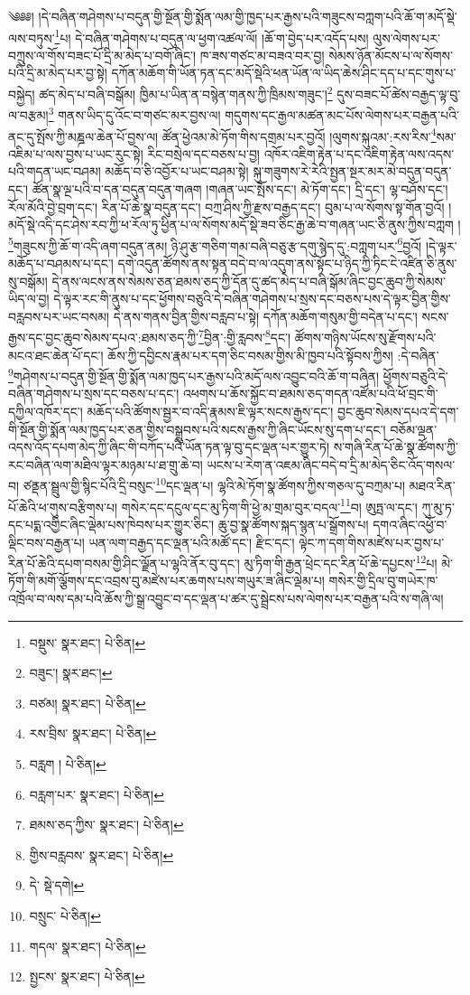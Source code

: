 \setcounter{footnote}{0} 
༄༅༅། །དེ་བཞིན་གཤེགས་པ་བདུན་གྱི་སྔོན་གྱི་སྨོན་ལམ་གྱི་ཁྱད་པར་རྒྱས་པའི་གཟུངས་བཀླག་པའི་ཆོ་ག་མདོ་སྡེ་ལས་བཏུས་\footnote{བསྡུས་  སྣར་ཐང་།  པེ་ཅིན། }པ། དེ་བཞིན་གཤེགས་པ་བདུན་ལ་ཕྱག་འཚལ་ལོ། །ཆོ་ག་བྱེད་པར་འདོད་པས། ལུས་ལེགས་པར་བཀྲུས་ལ་གོས་བཟང་པོ་དྲི་མ་མེད་པ་བགོ་ཞིང་། ཁ་ཟས་གཙང་མ་བཟའ་བར་བྱ། སེམས་ཉོན་མོངས་པ་ལ་སོགས་པའི་དྲི་མ་མེད་པར་བྱ་སྟེ། དཀོན་མཆོག་གི་ཡོན་ཏན་དང་མདོ་སྡེའི་ཕན་ཡོན་ལ་ཡིད་ཆེས་ཤིང་དད་པ་དང་གུས་པ་བསྐྱེད། ཚད་མེད་པ་བཞི་བསྒོམ། ཁྱིམ་པ་ཡིན་ན་བསྙེན་གནས་ཀྱི་ཁྲིམས་གཟུང་།\footnote{བཟུང་།  སྣར་ཐང་། } དུས་བཟང་པོ་ཚེས་བརྒྱད་ལྟ་བུ་ལ་བརྩམ།\footnote{བཙམ།  སྣར་ཐང་།  པེ་ཅིན། } གནས་ཡིད་དུ་འོང་བ་གཙང་མར་བྱས་ལ། གདུགས་དང་རྒྱལ་མཚན་མང་པོས་ལེགས་པར་བརྒྱན་པའི་ནང་དུ་སྤོས་ཀྱི་མཎྜལ་ཆེན་པོ་བྱས་ལ། ཚོན་ཕྱེའམ་མེ་ཏོག་གིས་དགྲམ་པར་བྱའོ། །ལུགས་སྐུའམ་:རས་རིས་\footnote{རས་བྲིས་  སྣར་ཐང་།  པེ་ཅིན། }སམ་འཇིམ་པ་ལས་བྱས་པ་ཡང་རུང་སྟེ། རིང་བསྲེལ་དང་བཅས་པ་བྱ། འཁོར་འཇིག་རྟེན་པ་དང་འཇིག་རྟེན་ལས་འདས་པའི་གདན་ཡང་བཤམ། མཆོད་བ་ཅི་འབྱོར་པ་ཡང་བཤམ་སྟེ། སྐུ་གཟུགས་རེ་རེའི་སྤྱན་སྔར་མར་མེ་བདུན་བདུན་དང་། ཚོན་སྣ་ལྔ་པའི་བ་དན་བདུན་བདུན་གཞག །གཞན་ཡང་སྤོས་དང་། མེ་ཏོག་དང་། དྲི་དང་། ལྷ་བཤོས་དང་། རོལ་མོའི་བྱེ་བྲག་དང་། རིན་པོ་ཆེ་སྣ་བདུན་དང་། བཀྲ་ཤིས་ཀྱི་རྫས་བརྒྱད་དང་། བུམ་པ་ལ་སོགས་སྟ་གོན་བྱའོ། །མདོ་སྡེ་འདི་དང་ཤེས་རབ་ཀྱི་ཕ་རོལ་ཏུ་ཕྱིན་པ་ལ་སོགས་མདོ་སྡེ་ཟབ་ཅིང་རྒྱ་ཆེ་བ་གཞན་ཡང་ཅི་ནུས་ཀྱིས་བཀླག །\footnote{བརླག །  པེ་ཅིན། }གཟུངས་ཀྱི་ཆོ་ག་འདི་ཞག་བདུན་ནམ། ཉི་ཤུ་རྩ་གཅིག་གམ་བཞི་བཅུ་རྩ་དགུ་སྙེད་དུ་:བཀླག་པར་\footnote{བརླག་པར་  སྣར་ཐང་།  པེ་ཅིན། }བྱའོ། །དེ་ལྟར་མཆོད་པ་བཤམས་པ་དང་། དགེ་འདུན་ཚོགས་ནས་སྟན་བདེ་བ་ལ་འདུག་ནས་སྟོང་པ་ཉིད་ཀྱི་ཏིང་ངེ་འཛིན་ཅི་ནུས་སུ་བསྒོམ། དེ་ནས་ལངས་ནས་སེམས་ཅན་ཐམས་ཅད་ཀྱི་དོན་དུ་ཚད་མེད་པ་བཞི་སྒོམ་ཞིང་བྱང་ཆུབ་ཀྱི་སེམས་ཡིད་ལ་བྱ། དེ་ལྟར་རང་གི་ནུས་པ་དང་ཕྱོགས་བཅུའི་དེ་བཞིན་གཤེགས་པ་སྲས་དང་བཅས་པས་དེ་ལྟར་བྱིན་གྱིས་བརླབས་པར་ཡང་བསམ། དེ་ནས་གནས་བྱིན་གྱིས་བརླབ་པ་སྟེ། དཀོན་མཆོག་གསུམ་གྱི་བདེན་པ་དང་། སངས་རྒྱས་དང་བྱང་ཆུབ་སེམས་དཔའ་:ཐམས་ཅད་ཀྱི་\footnote{ཐམས་ཅད་ཀྱིས་  སྣར་ཐང་།  པེ་ཅིན། }བྱིན་:གྱི་རླབས་\footnote{གྱིས་བརླབས་  སྣར་ཐང་།  པེ་ཅིན། }དང་། ཚོགས་གཉིས་ཡོངས་སུ་རྫོགས་པའི་མངའ་ཐང་ཆེན་པོ་དང་། ཆོས་ཀྱི་དབྱིངས་རྣམ་པར་དག་ཅིང་བསམ་གྱིས་མི་ཁྱབ་པའི་སྟོབས་ཀྱིས། :དེ་བཞིན་\footnote{དེ་  སྡེ་དགེ། }གཤེགས་པ་བདུན་གྱི་སྔོན་གྱི་སྨོན་ལམ་ཁྱད་པར་རྒྱས་པའི་མདོ་ལས་འབྱུང་བའི་ཆོ་ག་བཞིན། ཕྱོགས་བཅུའི་དེ་བཞིན་གཤེགས་པ་སྲས་དང་བཅས་པ་དང་། འཕགས་པ་ཆོས་སྐྱོང་བ་ཐམས་ཅད་གདན་འཛོམ་པའི་ཕོ་བྲང་གི་དཀྱིལ་འཁོར་དང་། མཆོད་པའི་ཚོགས་སྦྱར་བ་འདི་རྣམས་ཇི་ལྟར་སངས་རྒྱས་དང་། བྱང་ཆུབ་སེམས་དཔའ་དེ་དག་གི་སྔོན་གྱི་སྨོན་ལམ་ཁྱད་པར་ཅན་གྱིས་བསྒྲུབས་པའི་སངས་རྒྱས་ཀྱི་ཞིང་ཡོངས་སུ་དག་པ་དང་། བཅོམ་ལྡན་འདས་འོད་དཔག་མེད་ཀྱི་ཞིང་གི་བཀོད་པའི་ཡོན་ཏན་ལྟ་བུ་དང་ལྡན་པར་གྱུར་ཏེ། ས་གཞི་རིན་པོ་ཆེ་སྣ་ཚོགས་ཀྱི་རང་བཞིན་ལག་མཐིལ་ལྟར་མཉམ་པ་ཐ་གྲུ་ཆེ་བ། ཡངས་པ་རེག་ན་འཇམ་ཞིང་བདེ་བ་དྲི་མ་མེད་ཅིང་འོད་གསལ་བ། ཙནྡན་སྦྲུལ་གྱི་སྙིང་པོའི་དྲི་བསུང་\footnote{བསྲུང་  པེ་ཅིན། }དང་ལྡན་པ། ལྷའི་མེ་ཏོག་སྣ་ཚོགས་ཀྱིས་གཅལ་དུ་བཀྲམ་པ། མཐའ་རིན་པོ་ཆེའི་ཕ་གུས་བརྩིགས་པ། གསེར་དང་དངུལ་དང་མུ་ཏིག་གི་ཕྱེ་མ་གྲམ་བུར་བདལ་\footnote{གདལ་  སྣར་ཐང་།  པེ་ཅིན། }བ། ཨུཏྤ་ལ་དང་། ཀུ་མུ་ཏ་དང་པདྨ་འགྱིང་ཞིང་ལྡེམ་པས་ཁེབས་པར་གྱུར་ཅིང་། ཆུ་བྱ་སྣ་ཚོགས་སྐད་སྙན་པ་སྒྲོགས་པ། དགའ་ཞིང་འཕྱོ་བ་ལྡིང་བས་བརྒྱན་པ། ཡན་ལག་བརྒྱད་དང་ལྡན་པའི་མཚོ་དང་། རྫིང་དང་། ལྟེང་ཀ་དག་གིས་མཛེས་པར་བྱས་པ་རིན་པོ་ཆེའི་དཔག་བསམ་གྱི་ཤིང་ལྗོན་པ་ལྷའི་ནོར་བུ་དང་། མུ་ཏིག་གི་རྒྱན་ཕྲེང་དང་རིན་པོ་ཆེ་དཔྱངས་\footnote{སྤྱངས་  སྣར་ཐང་།  པེ་ཅིན། }པ། མེ་ཏོག་གི་མགོ་ལྕོགས་དང་འབྲས་བུ་མཛེས་པར་ཆགས་པས་གཡུར་ཟ་ཞིང་ལྡེམ་པ། གསེར་གྱི་དྲིལ་བུ་གཡེར་ཁ་འཁྲོལ་བ་ལས་དམ་པའི་ཆོས་ཀྱི་སྒྲ་འབྱུང་བ་དང་ལྡན་པ་ཚར་དུ་སྦྲེངས་པས་ལེགས་པར་བརྒྱན་པའི་ས་གཞི་ལ། 